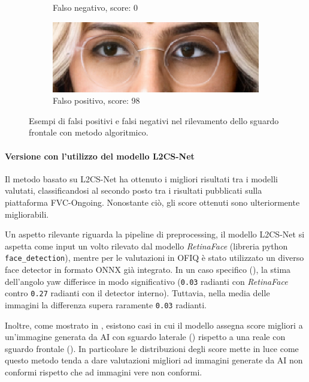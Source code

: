 \documentclass[12pt,a4paper,openright,twoside]{book}
\begin{document}
\begin{figure}[htbp]
\begin{subfigure}{0.49\textwidth}
        \caption{Falso negativo, score: 0}
        \label{fig:frontal_gaze_algo_weakness_3}
    \end{subfigure}
    \begin{subfigure}{0.49\textwidth}
        \centering
        \includegraphics[width=.7\linewidth]{figures/frontal-gaze-algo-false-positive-98-1.png}
        \caption{Falso positivo, score: 98}
        \label{fig:frontal_gaze_algo_weakness_4}
    \end{subfigure}
    \caption{Esempi di falsi positivi e falsi negativi nel rilevamento dello sguardo frontale con metodo algoritmico.}
    \label{fig:frontal_gaze_algo_weakness}
\end{figure}

\paragraph{Versione con l'utilizzo del modello L2CS-Net}
Il metodo basato su L2CS-Net ha ottenuto i migliori risultati tra i modelli valutati, classificandosi al secondo posto tra i risultati pubblicati sulla piattaforma FVC-Ongoing. Nonostante ciò, gli score ottenuti sono ulteriormente migliorabili.  

Un aspetto rilevante riguarda la pipeline di preprocessing, il modello L2CS-Net si aspetta come input un volto rilevato dal modello \textit{RetinaFace} (libreria python \texttt{face\_detection}), mentre per le valutazioni in OFIQ è stato utilizzato un diverso face detector in formato ONNX già integrato. In un caso specifico (), la stima dell'angolo yaw differisce in modo significativo (\texttt{0.03} radianti con \textit{RetinaFace} contro \texttt{0.27} radianti con il detector interno). Tuttavia, nella media delle immagini la differenza supera raramente \texttt{0.03} radianti.

Inoltre, come mostrato in , esistono casi in cui il modello assegna score migliori a un'immagine generata da AI con sguardo laterale () rispetto a una reale con sguardo frontale ().
In particolare le distribuzioni degli score mette in luce come questo metodo tenda a dare valutazioni migliori ad immagini generate da AI non conformi rispetto che ad immagini vere non conformi.
\end{document}
